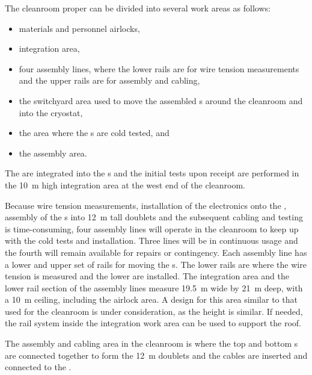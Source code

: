 The cleanroom proper can be divided into several work areas as follows:
\begin{itemize}
\setlength\itemsep{1mm}
\setlength{\parsep}{1mm}
\setlength{\itemsep}{-5mm}
    \item materials and personnel airlocks,
    \item {} integration area,
    \item four  assembly lines, where the lower rails are for wire tension measurements and the upper rails are for  assembly and cabling,
    \item the switchyard area used to move the assembled s around the cleanroom and into the cryostat,
    \item the \coldbox area where the s are cold tested, and
    \item the  assembly area.
\end{itemize}




The  are integrated into the s and the initial  tests upon receipt are performed in the \SI{10}{m} high  integration area at the west end of the cleanroom. 


Because  wire tension measurements, installation of the  electronics onto the , assembly of the s into \SI{12}{m} tall doublets and the subsequent cabling and testing is time-consuming, four assembly lines will operate in the cleanroom to keep up with the cold tests and installation. 
Three lines will be in continuous usage and the fourth will remain available for repairs or contingency. 
Each assembly line has a lower and upper set of rails for moving the s. The lower rails are where the wire tension is measured and the lower   are installed.  The  integration area and the lower rail section of the assembly lines measure \SI{19.5}{m} wide by \SI{21}{m} deep, with a \SI{10}{m} ceiling, including the airlock area. A design for this area similar to that used for the  cleanroom is under consideration, as the height is similar.  If needed, the rail system inside the integration work area can be used to support the roof.
 
The  assembly and cabling area in the cleanroom is where the top and bottom s are connected together to form the \SI{12}{m}  doublets and the  cables are inserted and connected to the . 


